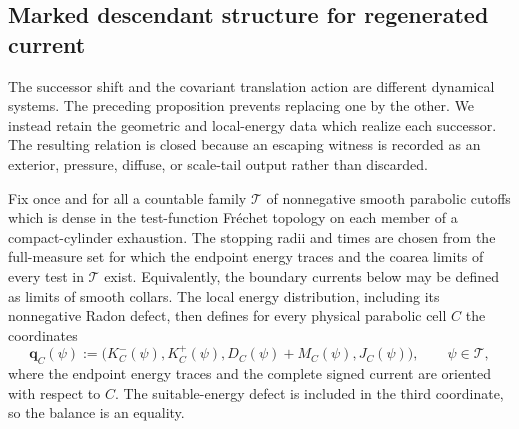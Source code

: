 \documentclass[11pt]{amsart}
\numberwithin{equation}{section}
\theoremstyle{plain}
\theoremstyle{definition}
\theoremstyle{remark}
\begin{document}
\subsection{Marked descendant structure for regenerated current}
\label{app:marked-regeneration}

The successor shift and the covariant translation action are different
dynamical systems.  The preceding proposition prevents replacing one by the
other.  We instead retain the geometric and local-energy data which realize
each successor.  The resulting relation is closed because an escaping witness
is recorded as an exterior, pressure, diffuse, or scale-tail output rather than
discarded.

Fix once and for all a countable family \(\mathscr T\) of nonnegative smooth
parabolic cutoffs which is dense in the test-function Fr\'echet topology on
each member of a compact-cylinder exhaustion.  The stopping radii and times
are chosen from the full-measure set for which the endpoint energy traces and
the coarea limits of every test in \(\mathscr T\) exist.  Equivalently, the
boundary currents below may be defined as limits of smooth collars.  The local
energy distribution, including its nonnegative Radon defect, then defines for
every physical parabolic cell \(C\) the coordinates
\begin{equation}\label{eq:marked-local-energy-coordinates}
 \mathbf q_C(\psi):=
 \bigl(K_C^-(\psi),K_C^+(\psi),D_C(\psi)+M_C(\psi),J_C(\psi)\bigr),
 \qquad \psi\in\mathscr T,
\end{equation}
where the endpoint energy traces and the complete signed current are oriented with
respect to \(C\).  The suitable-energy defect is included in the third
coordinate, so the balance is an equality.
\end{document}
